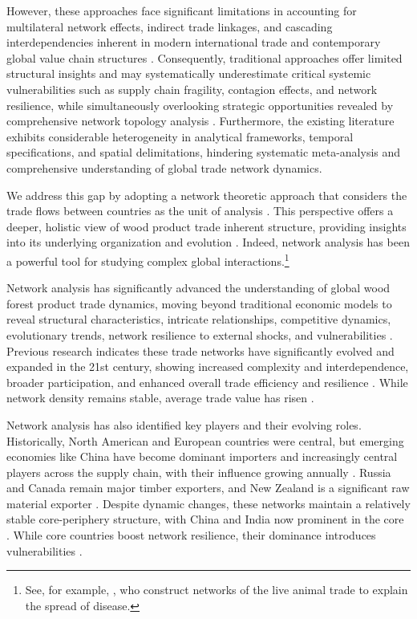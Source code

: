\documentclass[
  authoryear,
  review,
  3p]{elsarticle}
\begin{document}
However, these approaches face significant limitations in accounting for
multilateral network effects, indirect trade linkages, and cascading
interdependencies inherent in modern international trade and
contemporary global value chain structures
\citep{de2011world, amador2017networks, liu2025spatial}. Consequently,
traditional approaches offer limited structural insights and may
systematically underestimate critical systemic vulnerabilities such as
supply chain fragility, contagion effects, and network resilience, while
simultaneously overlooking strategic opportunities revealed by
comprehensive network topology analysis
\citep{fevre2006animal, huang_static_2024}. Furthermore, the existing
literature exhibits considerable heterogeneity in analytical frameworks,
temporal specifications, and spatial delimitations, hindering systematic
meta-analysis and comprehensive understanding of global trade network
dynamics.

We address this gap by adopting a network theoretic approach that
considers the trade flows between countries as the unit of analysis
\citep{de2011world, amador2017networks}. This perspective offers a
deeper, holistic view of wood product trade inherent structure,
providing insights into its underlying organization and evolution
\citep{long_exploring_2019, shen_structural_2022}. Indeed, network
analysis has been a powerful tool for studying complex global
interactions.\footnote{See, for example, \citep{fevre2006animal}, who
  construct networks of the live animal trade to explain the spread of
  disease.}

Network analysis has significantly advanced the understanding of global
wood forest product trade dynamics, moving beyond traditional economic
models to reveal structural characteristics, intricate relationships,
competitive dynamics, evolutionary trends, network resilience to
external shocks, and vulnerabilities
\citep{lovric_social_2018, long_exploring_2019, gao_trade_2024, huang_static_2024}.
Previous research indicates these trade networks have significantly
evolved and expanded in the 21st century, showing increased complexity
and interdependence, broader participation, and enhanced overall trade
efficiency and resilience
\citep{wang_exploratory_2020, gao_trade_2024, huang_static_2024, liu_analysis_2024}.
While network density remains stable, average trade value has risen
\citep{zhou_spatial_2021}.

Network analysis has also identified key players and their evolving
roles. Historically, North American and European countries were central,
but emerging economies like China have become dominant importers and
increasingly central players across the supply chain, with their
influence growing annually
\citep{zhou_spatial_2021, gao_trade_2024, huang_static_2024, liu_analysis_2024}.
Russia and Canada remain major timber exporters, and New Zealand is a
significant raw material exporter \citep{zhou_spatial_2021}. Despite
dynamic changes, these networks maintain a relatively stable
core-periphery structure, with China and India now prominent in the core
\citep{wang_exploratory_2020}. While core countries boost network
resilience, their dominance introduces vulnerabilities
\citep{huang_static_2024}.
\end{document}
